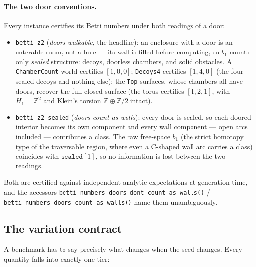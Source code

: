 \documentclass[11pt]{article}
\newcommand{\Z}{\mathbb{Z}}
\begin{document}
\paragraph{The two door conventions.} Every instance certifies its
Betti numbers under both readings of a door:
\begin{itemize}[leftmargin=2em, itemsep=1pt]
  \item \texttt{betti\_z2} (\emph{doors walkable}, the headline):
        an enclosure with a door is an enterable room, not a hole ---
        its wall is filled before computing, so $b_1$ counts only
        \emph{sealed} structure: decoys, doorless chambers, and solid
        obstacles. A \texttt{ChamberCount} world certifies
        $[1, 0, 0]$; \texttt{Decoys4} certifies $[1, 4, 0]$ (the
        four sealed decoys and nothing else); the \texttt{Top}
        surfaces, whose chambers all have doors, recover the full
        closed surface (the torus certifies $[1, 2, 1]$, with
        $H_1 = \Z^2$ and Klein's torsion $\Z \oplus \Z/2$ intact).
  \item \texttt{betti\_z2\_sealed} (\emph{doors count as walls}):
        every door is sealed, so each doored interior becomes its own
        component and every wall component --- open arcs included ---
        contributes a class. The raw free-space $b_1$ (the strict
        homotopy type of the traversable region, where even a
        C-shaped wall arc carries a class) coincides with
        $\texttt{sealed}[1]$, so no information is lost between the
        two readings.
\end{itemize}
Both are certified against independent analytic expectations at
generation time, and the accessors
\texttt{betti\_numbers\_doors\_dont\_count\_as\_walls()} /
\texttt{betti\_numbers\_doors\_count\_as\_walls()} name them
unambiguously.

\subsection{The variation contract}
\label{sec:variation}

A benchmark has to say precisely what changes when the seed changes.
Every quantity falls into exactly one tier:
\end{document}
